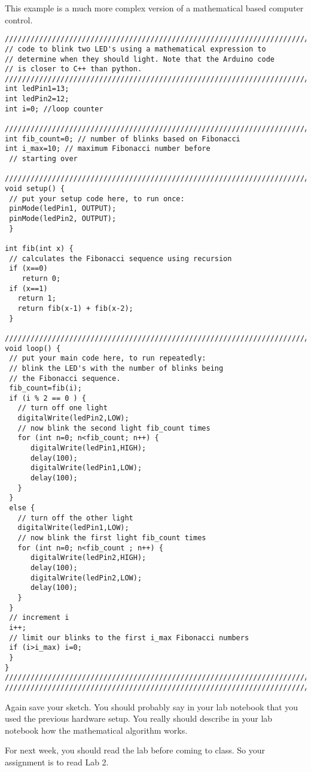 This example is a much more complex version of a mathematical based computer
control.
\begin{verbatim}
////////////////////////////////////////////////////////////////////////////
// code to blink two LED's using a mathematical expression to 
// determine when they should light. Note that the Arduino code
// is closer to C++ than python.
////////////////////////////////////////////////////////////////////////////
int ledPin1=13;
int ledPin2=12;
int i=0; //loop counter
 
////////////////////////////////////////////////////////////////////////////
int fib_count=0; // number of blinks based on Fibonacci
int i_max=10; // maximum Fibonacci number before 
 // starting over
 
////////////////////////////////////////////////////////////////////////////
void setup() {
 // put your setup code here, to run once:
 pinMode(ledPin1, OUTPUT);
 pinMode(ledPin2, OUTPUT);
 } 
 
int fib(int x) {
 // calculates the Fibonacci sequence using recursion
 if (x==0) 
    return 0;
 if (x==1)
   return 1;
   return fib(x-1) + fib(x-2);
 } 
 
////////////////////////////////////////////////////////////////////////////
void loop() {
 // put your main code here, to run repeatedly:
 // blink the LED's with the number of blinks being 
 // the Fibonacci sequence.
 fib_count=fib(i);
 if (i % 2 == 0 ) {
   // turn off one light
   digitalWrite(ledPin2,LOW);
   // now blink the second light fib_count times 
   for (int n=0; n<fib_count; n++) { 
      digitalWrite(ledPin1,HIGH);
      delay(100);
      digitalWrite(ledPin1,LOW);
      delay(100);
   }
 }
 else {
   // turn off the other light
   digitalWrite(ledPin1,LOW);
   // now blink the first light fib_count times
   for (int n=0; n<fib_count ; n++) { 
      digitalWrite(ledPin2,HIGH);
      delay(100);
      digitalWrite(ledPin2,LOW);
      delay(100);
   }
 }
 // increment i
 i++;
 // limit our blinks to the first i_max Fibonacci numbers
 if (i>i_max) i=0;
 }
}
////////////////////////////////////////////////////////////////////////////
////////////////////////////////////////////////////////////////////////////
\end{verbatim}

Again save your sketch. You should probably say in your lab notebook that
you used the previous hardware setup. You really should describe in your lab
notebook how the mathematical algorithm works.

For next week, you should read the lab before coming to class. So your
assignment is to read Lab 2.

\vspace*{\fill}%
\pagebreak
